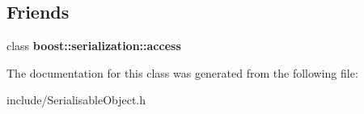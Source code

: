 \subsection*{Friends}
\begin{DoxyCompactItemize}
\item 
\hypertarget{classSerialisableObject_ac98d07dd8f7b70e16ccb9a01abf56b9c}{class {\bfseries boost\-::serialization\-::access}}\label{classSerialisableObject_ac98d07dd8f7b70e16ccb9a01abf56b9c}

\end{DoxyCompactItemize}


The documentation for this class was generated from the following file\-:\begin{DoxyCompactItemize}
\item 
include/Serialisable\-Object.\-h\end{DoxyCompactItemize}
